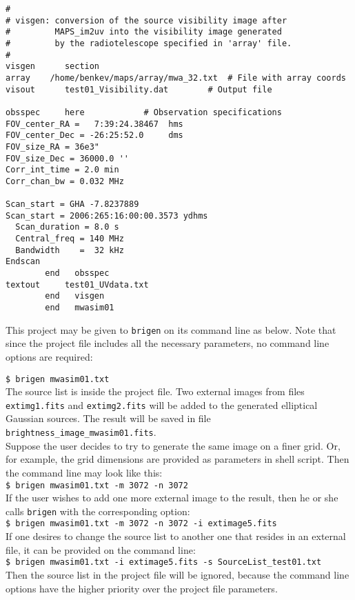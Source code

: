 \documentclass[letterpaper, oneside, 11pt]{article}
\begin{document}
\begin{verbatim}
#
# visgen: conversion of the source visibility image after 
#         MAPS_im2uv into the visibility image generated 
#         by the radiotelescope specified in 'array' file.
#
visgen		section
array    /home/benkev/maps/array/mwa_32.txt  # File with array coords
visout	  	test01_Visibility.dat	     # Output file

obsspec   	here			# Observation specifications
FOV_center_RA =   7:39:24.38467  hms
FOV_center_Dec = -26:25:52.0     dms
FOV_size_RA = 36e3"
FOV_size_Dec = 36000.0 ''
Corr_int_time = 2.0 min
Corr_chan_bw = 0.032 MHz

Scan_start = GHA -7.8237889
Scan_start = 2006:265:16:00:00.3573 ydhms
  Scan_duration = 8.0 s
  Central_freq = 140 MHz
  Bandwidth    =  32 kHz
Endscan
		end	  obsspec
textout	  	test01_UVdata.txt
	  	end	  visgen
	  	end	  mwasim01
\end{verbatim}

This project may be given to {\tt brigen} on its command line as below. Note that since the project file includes all the necessary parameters, no command line options are required: 

{\tt \$ brigen mwasim01.txt}\\

The source list is inside the project file. Two external images from files {\tt extimg1.fits} and {\tt extimg2.fits} will be added to the generated elliptical Gaussian sources. The result will be saved in file \\ 
{\tt brightness\_image\_mwasim01.fits}.\\

Suppose the user decides to try to generate the same image on a finer grid. Or, for example, the grid dimensions are provided as parameters in shell script. Then the command line may look like this:\\

{\tt \$ brigen mwasim01.txt -m 3072 -n 3072}\\

If the user wishes to add one more external image to the result, then he or she calls {\tt brigen} with the corresponding option:\\

{\tt \$ brigen mwasim01.txt -m 3072 -n 3072 -i extimage5.fits }\\

If one desires to change the source list to another one that resides in an external file, it can be provided on the command line:\\

{\tt \$ brigen mwasim01.txt -i extimage5.fits -s  SourceList\_test01.txt}\\

Then the source list in the project file will be ignored, because the command line options have the higher priority over the project file parameters. 
\end{document}

